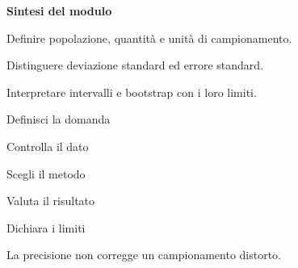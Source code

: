 \documentclass[12pt,aspectratio=1610]{beamer}
\begin{document}
\begin{lrbox}{\TitleBox}\begin{minipage}[t]{18.2cm}\color{Ink}\raggedright\sloppy\fontsize{20.7}{24}\selectfont
\bfseries\color{Navy}Sintesi del modulo
\end{minipage}\end{lrbox}
\begin{lrbox}{\BodyBox}\begin{minipage}[t]{10.25cm}\color{Ink}\raggedright\sloppy\fontsize{12.4}{16.4}\selectfont
Definire popolazione, quantità e unità di campionamento.\par\medskip Distinguere deviazione standard ed errore standard.\par\medskip Interpretare intervalli e bootstrap con i loro limiti.
\end{minipage}\end{lrbox}
\begin{lrbox}{\SideBox}\begin{minipage}[t]{7.45cm}\color{Ink}\raggedright\sloppy\fontsize{12.2}{16.1}\selectfont
{}\hspace{.35cm}Definisci la domanda\par\vspace{.22cm}\hspace{.35cm}Controlla il dato\par\vspace{.22cm}\hspace{.35cm}Scegli il metodo\par\vspace{.22cm}\hspace{.35cm}Valuta il risultato\par\vspace{.22cm}\hspace{.35cm}Dichiara i limiti\par\vspace{.22cm}
\end{minipage}\end{lrbox}
\begin{lrbox}{\RecallBox}\begin{minipage}[t]{16.45cm}\color{Ink}\raggedright\sloppy\fontsize{10.1}{13.2}\selectfont
La precisione non corregge un campionamento distorto.
\end{minipage}\end{lrbox}
\end{document}
